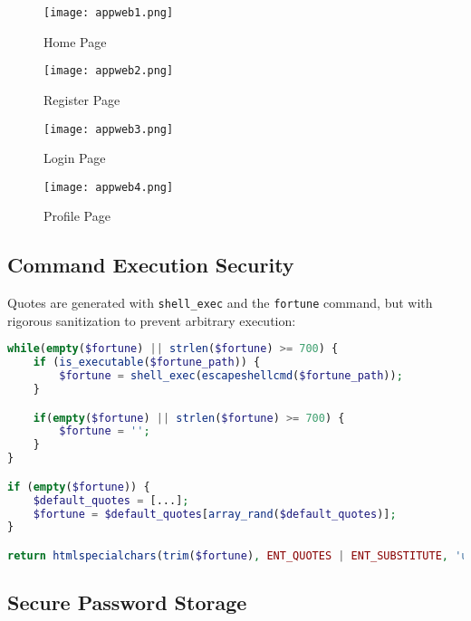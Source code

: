 \documentclass[12pt]{report}
\begin{document}
\begin{figure}[h]
    \centering
    \texttt{[image: appweb1.png]}
    \caption{Home Page}
    \label{fig:identifier}
\end{figure}

\begin{figure}[h]
    \centering
    \texttt{[image: appweb2.png]}
    \caption{Register Page}
    \label{fig:identifier}
\end{figure}

\begin{figure}[h]
    \centering
    \texttt{[image: appweb3.png]}
    \caption{Login Page}
    \label{fig:identifier}
\end{figure}

\begin{figure}[h]
    \centering
    \texttt{[image: appweb4.png]}
    \caption{Profile Page}
    \label{fig:identifier}
\end{figure}

\newpage

\subsection*{Command Execution Security}

Quotes are generated with \texttt{shell\_exec} and the \texttt{fortune} command, but with rigorous sanitization to prevent arbitrary execution:

\begin{lstlisting}[language=php, caption={Sanitization of shell\_exec Command}]
while(empty($fortune) || strlen($fortune) >= 700) {
    if (is_executable($fortune_path)) {
        $fortune = shell_exec(escapeshellcmd($fortune_path));
    }

    if(empty($fortune) || strlen($fortune) >= 700) {
        $fortune = '';
    }
}

if (empty($fortune)) {
    $default_quotes = [...];
    $fortune = $default_quotes[array_rand($default_quotes)];
}

return htmlspecialchars(trim($fortune), ENT_QUOTES | ENT_SUBSTITUTE, 'utf-8');
\end{lstlisting}

\subsection*{Secure Password Storage}
\end{document}
